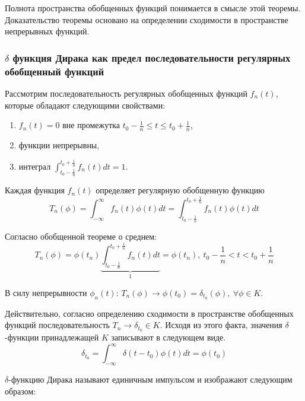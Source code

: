 \documentclass[14pt,a4paper]{extarticle}
\theoremstyle{definition}
\theoremstyle{remark}
\renewcommand{\[}{\begin{dmath*}[compact]}
\renewcommand{\]}{\end{dmath*}}
\newcommand{\be}{\begin{enumerate}}
\newcommand{\ee}{\end{enumerate}}
\newcommand{\ds}{\displaystyle}
\newcommand{\sep}{ , \ \allowbreak }
\begin{document}
Полнота пространства обобщенных функций понимается в смысле этой теоремы.
Доказательство теоремы основано на определении сходимости в пространстве
непрерывных функций.

\subsubsection{$\delta$ функция Дирака как предел последовательности
регулярных обобщенный функций}

Рассмотрим последовательность регулярных обобщенных функций $f_n(t)$,
которые обладают следующими свойствами:
\be
  \item $f_n(t) = 0$ вне  промежутка $t_0-\frac1n \leq t \leq t_0+\frac1n$,

  \item функции непрерывны,

  \item интеграл $\ds\int_{t_0-\frac1n}^{t_0+\frac1n} f_n(t)dt=1$.
\ee


Каждая функция $f_n(t)$ определяет регулярную обобщенную функцию
\[T_n(\phi) = \int_{-\infty}^\infty f_n(t)\phi(t)dt
= \int_{t_0-\frac1n}^{t_0+\frac1n}f_n(t)\phi(t)dt \]

Согласно обобщенной теореме о среднем:
\[T_n(\phi) = \phi(t_n) \underbrace{\int_{t_0-\frac1n}^{t_0+\frac1n}f_n(t)dt}_1
= \phi(t_n) \sep t_0-\frac1n < t < t_0+\frac1n\]

В силу непрерывности $\phi_n(t)$: $T_n(\phi) \to \phi(t_0)
= \delta_{t_0}(\phi) \sep \forall \phi \in K$.

Действительно, согласно определению сходимости в пространстве обобщенных
функций последовательность $T_n \to \delta_{t_0} \in K$.
Исходя из этого факта, значения $\delta$-функции принадлежащей $K$
записывают в следующем виде.
\[\delta_{t_0} = \int_{-\infty}^\infty \delta (t-t_0)\phi(t)dt = \phi (t_0)\]

$\delta$-функцию Дирака называют единичным импульсом
и изображают следующим образом:

\end{document}
